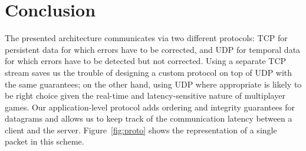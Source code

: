 \documentclass[sigconf, nonacm=true, natbib=false]{acmart}
\begin{document}
\section{Conclusion}

The presented architecture communicates via two different protocols: TCP for persistent data for which errors have to be
corrected, and UDP for temporal data for which errors have to be detected but not corrected.
Using a separate TCP stream saves us the trouble of designing a custom protocol on top of UDP with the same guarantees;
on the other hand, using UDP where appropriate is likely to be right choice given the real-time and latency-sensitive nature
of multiplayer games. Our application-level protocol adds ordering and integrity guarantees for datagrams and allows us to
keep track of the communication latency between a client and the server. Figure~\ref{fig:proto} shows the representation of a single packet
in this scheme.



\printbibliography
\end{document}
